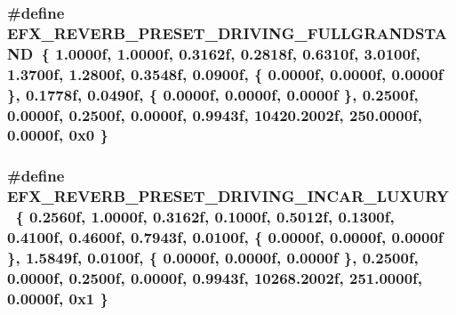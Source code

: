 \subsubsection[{\texorpdfstring{E\+F\+X\+\_\+\+R\+E\+V\+E\+R\+B\+\_\+\+P\+R\+E\+S\+E\+T\+\_\+\+D\+R\+I\+V\+I\+N\+G\+\_\+\+F\+U\+L\+L\+G\+R\+A\+N\+D\+S\+T\+A\+ND}{EFX_REVERB_PRESET_DRIVING_FULLGRANDSTAND}}]{\setlength{\rightskip}{0pt plus 5cm}\#define E\+F\+X\+\_\+\+R\+E\+V\+E\+R\+B\+\_\+\+P\+R\+E\+S\+E\+T\+\_\+\+D\+R\+I\+V\+I\+N\+G\+\_\+\+F\+U\+L\+L\+G\+R\+A\+N\+D\+S\+T\+A\+ND~\{ 1.\+0000f, 1.\+0000f, 0.\+3162f, 0.\+2818f, 0.\+6310f, 3.\+0100f, 1.\+3700f, 1.\+2800f, 0.\+3548f, 0.\+0900f, \{ 0.\+0000f, 0.\+0000f, 0.\+0000f \}, 0.\+1778f, 0.\+0490f, \{ 0.\+0000f, 0.\+0000f, 0.\+0000f \}, 0.\+2500f, 0.\+0000f, 0.\+2500f, 0.\+0000f, 0.\+9943f, 10420.\+2002f, 250.\+0000f, 0.\+0000f, 0x0 \}}\hypertarget{efx-presets_8h_a73de691b5ec4544039c8e61c175d35fc}{}\label{efx-presets_8h_a73de691b5ec4544039c8e61c175d35fc}
\subsubsection[{\texorpdfstring{E\+F\+X\+\_\+\+R\+E\+V\+E\+R\+B\+\_\+\+P\+R\+E\+S\+E\+T\+\_\+\+D\+R\+I\+V\+I\+N\+G\+\_\+\+I\+N\+C\+A\+R\+\_\+\+L\+U\+X\+U\+RY}{EFX_REVERB_PRESET_DRIVING_INCAR_LUXURY}}]{\setlength{\rightskip}{0pt plus 5cm}\#define E\+F\+X\+\_\+\+R\+E\+V\+E\+R\+B\+\_\+\+P\+R\+E\+S\+E\+T\+\_\+\+D\+R\+I\+V\+I\+N\+G\+\_\+\+I\+N\+C\+A\+R\+\_\+\+L\+U\+X\+U\+RY~\{ 0.\+2560f, 1.\+0000f, 0.\+3162f, 0.\+1000f, 0.\+5012f, 0.\+1300f, 0.\+4100f, 0.\+4600f, 0.\+7943f, 0.\+0100f, \{ 0.\+0000f, 0.\+0000f, 0.\+0000f \}, 1.\+5849f, 0.\+0100f, \{ 0.\+0000f, 0.\+0000f, 0.\+0000f \}, 0.\+2500f, 0.\+0000f, 0.\+2500f, 0.\+0000f, 0.\+9943f, 10268.\+2002f, 251.\+0000f, 0.\+0000f, 0x1 \}}\hypertarget{efx-presets_8h_a0293b34a2488fe018f03138c9ebe391f}{}\label{efx-presets_8h_a0293b34a2488fe018f03138c9ebe391f}
